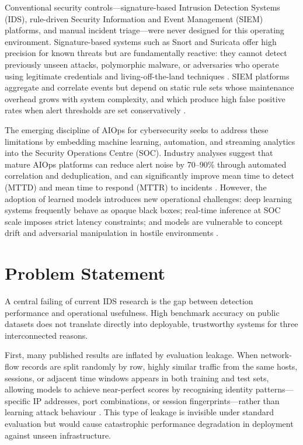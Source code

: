 \documentclass[12pt,a4paper]{report}
\begin{document}
Conventional security controls---signature-based Intrusion Detection Systems (IDS), rule-driven Security Information and Event Management (SIEM) platforms, and manual incident triage---were never designed for this operating environment. Signature-based systems such as Snort and Suricata offer high precision for known threats but are fundamentally reactive: they cannot detect previously unseen attacks, polymorphic malware, or adversaries who operate using legitimate credentials and living-off-the-land techniques \citep{ahmad2021}. SIEM platforms aggregate and correlate events but depend on static rule sets whose maintenance overhead grows with system complexity, and which produce high false positive rates when alert thresholds are set conservatively \citep{zhu2023}.

The emerging discipline of AIOps for cybersecurity seeks to address these limitations by embedding machine learning, automation, and streaming analytics into the Security Operations Centre (SOC). Industry analyses suggest that mature AIOps platforms can reduce alert noise by 70--90\% through automated correlation and deduplication, and can significantly improve mean time to detect (MTTD) and mean time to respond (MTTR) to incidents \citep{dang2023,nguyen2024}. However, the adoption of learned models introduces new operational challenges: deep learning systems frequently behave as opaque black boxes; real-time inference at SOC scale imposes strict latency constraints; and models are vulnerable to concept drift and adversarial manipulation in hostile environments \citep{schwarzschild2021,goldblum2023}.

\section{Problem Statement}
\label{sec:problem}

A central failing of current IDS research is the gap between detection performance and operational usefulness. High benchmark accuracy on public datasets does not translate directly into deployable, trustworthy systems for three interconnected reasons.

First, many published results are inflated by evaluation leakage. When network-flow records are split randomly by row, highly similar traffic from the same hosts, sessions, or adjacent time windows appears in both training and test sets, allowing models to achieve near-perfect scores by recognising identity patterns---specific IP addresses, port combinations, or session fingerprints---rather than learning attack behaviour \citep{turcotte2017}. This type of leakage is invisible under standard evaluation but would cause catastrophic performance degradation in deployment against unseen infrastructure.
\end{document}

